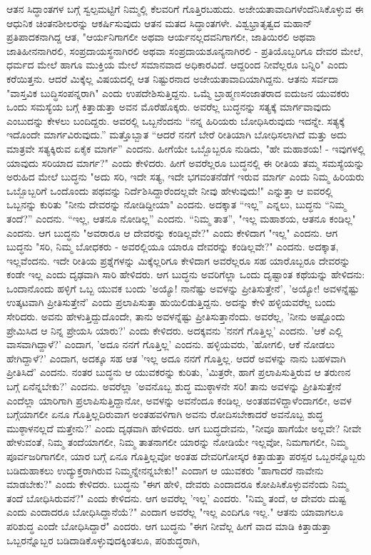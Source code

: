 ಆತನ ಸಿದ್ಧಾಂತಗಳ ಬಗ್ಗೆ ಸ್ವಲ್ಪಮಟ್ಟಿಗೆ ನಿಮ್ಮಲ್ಲಿ ಕೆಲವರಿಗೆ ಗೊತ್ತಿರಬಹುದು. ಅಜೇಯತಾವಾದಿಗಳೆಂದೆನಿಸಿಕೊಳ್ಳುವ ಈ ಆಧುನಿಕ ಚಿಂತನಶೀಲರನ್ನು ಆಕರ್ಷಿಸುವುದು ಆತನ ಮತದ ಸಿದ್ಧಾಂತಗಳೇ. ವಿಶ್ವಭ್ರಾತೃತ್ವದ ಮಹಾನ್ ಪ್ರತಿಪಾದಕನಾಗಿದ್ದ ಆತ, "ಆರ್ಯನಿಗಾಗಲೀ ಅಥವಾ ಆರ್ಯನಲ್ಲದವನಿಗಾಗಲೀ, ಜಾತಿಯಿರಲಿ ಅಥವಾ ಜಾತಿಹೀನನಾಗಿರಲಿ, ಸಂಪ್ರದಾಯಸ್ಥನಾಗಿರಲಿ ಅಥವಾ ಸಂಪ್ರದಾಯಶೂನ್ಯನಾಗಿರಲಿ - ಪ್ರತಿಯೊಬ್ಬರಿಗೂ ದೇವರ ಮೇಲೆ, ಧರ್ಮದ ಮೇಲೆ ಹಾಗೂ ಮುಕ್ತಿಯ ಮೇಲೆ ಸಮಾನವಾದ ಅಧಿಕಾರವಿದೆ. ಆದ್ದರಿಂದ ನೀವೆಲ್ಲರೂ ಬನ್ನಿರಿ" ಎಂದು ಕರೆಯಿತ್ತನು. ಆದರೆ ಮಿಕ್ಕೆಲ್ಲ ವಿಷಯದಲ್ಲಿ ಆತ ನಿಷ್ಟುರನಾದ ಅಜೇಯತಾವಾದಿಯಾಗಿದ್ದನು. ಆತನು ಸರ್ವದಾ "ವಾಸ್ತವಿಕ ಬುದ್ಧಿಸಂಪನ್ನರಾಗಿ" ಎಂದು ಉಪದೇಶಿಸುತ್ತಿದ್ದನು. ಒಮ್ಮೆ ಬ್ರಾಹ್ಮಣಸಂಜಾತರಾದ ಐದುಜನ ಯುವಕರು ಒಂದು ಸಮಸ್ಯೆಯ ಬಗ್ಗೆ ಕಿತ್ತಾಡುತ್ತಾ ಅವನ ಮೊರೆಹೊಕ್ಕರು. ಅವರೆಲ್ಲ ಬುದ್ಧನನ್ನು ಸತ್ಯಕ್ಕೆ ಮಾರ್ಗವಾವುದು ಎಂಬುದನ್ನು ಕೇಳಲು ಬಂದಿದ್ದರು. ಅವರಲ್ಲಿ ಒಬ್ಬನೆಂದನು “ನನ್ನ ಹಿರಿಯರು ಬೋಧಿಸಿರುವುದು ಇದನ್ನೇ. ಸತ್ಯಕ್ಕೆ ಇದೊಂದೇ ಮಾರ್ಗವಿರುವುದು.” ಮತ್ತೊಬ್ಬಾತ “ಆದರೆ ನನಗೆ ಬೇರೆ ರೀತಿಯಾಗಿ ಬೋಧಿಸಲಾಗಿದೆ ಮತ್ತು ಅದು ಮಾತ್ರವೇ ಸತ್ಯಕ್ಕಿರುವ ಏಕೈಕ ಮಾರ್ಗ” ಎಂದನು. ಹೀಗೆಯೇ ಒಬ್ಬೊಬ್ಬರೂ ನುಡಿದು, "ಹೇ ಮಹಾಶಯ! - ಇವುಗಳಲ್ಲಿ ಯಾವುದು ಸರಿಯಾದ ಮಾರ್ಗ?" ಎಂದು ಕೇಳಿದರು. ಹೀಗೆ ಅವರೆಲ್ಲರೂ ಬುದ್ಧನಲ್ಲಿ ಈ ರೀತಿಯ ತಮ್ಮ ಸಮಸ್ಯೆಯನ್ನು ಅರುಹಿದ ಮೇಲೆ ಬುದ್ಧನು "ಅದು ಸರಿ, ಇದೇ ಸತ್ಯ, ಇದೇ ಭಗವಂತನೆಡೆಗೆ ಇರುವ ಮಾರ್ಗ ಎಂದು ನಿಮ್ಮ ಹಿರಿಯರು ಒಬ್ಬೊಬ್ಬರಿಗೆ ಒಂದೊಂದು ಪಥವನ್ನು ನಿರ್ದೆಶಿಸಿದ್ದಾರೆಂದಲ್ಲವೇ ನೀವು ಹೇಳುವುದು!" ಎನ್ನುತ್ತಾ ಆ ಐವರಲ್ಲಿ ಒಬ್ಬನನ್ನು ಕುರಿತು "ನೀನು ದೇವರನ್ನು ನೋಡಿದ್ದೀಯಾ" ಎಂದನು. ಅದಕ್ಕಾತ “ಇಲ್ಲ” ಎನ್ನಲು, ಬುದ್ಧನು “ನಿಮ್ಮ ತಂದೆ?” ಎಂದನು. “ಇಲ್ಲ, ಆತನೂ ನೋಡಿಲ್ಲ” ಎಂದನು. “ನಿಮ್ಮ ತಾತ”, "ಇಲ್ಲ ಮಹಾಶಯ, ಆತನೂ ಕಂಡಿಲ್ಲ" ಎಂದನು. ಆಗ ಬುದ್ಧನು "ಅವರಾರೂ ಆ ದೇವರನ್ನು ಕಂಡಿಲ್ಲವೇ?" ಎಂದು ಕೇಳಿದಾಗ "ಇಲ್ಲ" ಎಂದನು. ಆಗ ಬುದ್ಧನು "ಸರಿ, ನಿಮ್ಮ ಬೋಧಕರು - ಅವರಲ್ಲಿಯೂ ಯಾರೂ ದೇವರನ್ನು ಕಂಡಿಲ್ಲವೇ?" ಎಂದನು. ಅದಕ್ಕಾತ, ಇಲ್ಲವೆಂದನು. ಇದೇ ರೀತಿಯ ಪ್ರಶ್ನೆಗಳನ್ನು ಮಿಕ್ಕೆಲ್ಲರಿಗೂ ಕೇಳಿದಾಗ ಅವರೆಲ್ಲರೂ ಸಹ ಯಾರೊಬ್ಬರೂ ದೇವರನ್ನು ಕಂಡೇ ಇಲ್ಲ ಎಂದು ದೃಢವಾಗಿ ಸಾರಿ ಹೇಳಿದರು. ಆಗ ಬುದ್ಧನು ಅವರಿಗೆಲ್ಲಾ ಒಂದು ದೃಷ್ಟಾಂತ ಕಥೆಯನ್ನು ಹೇಳಿದನು: ಒಂದಾನೊಂದು ಹಳ್ಳಿಗೆ ಒಬ್ಬ ಯುವಕ ಬಂದು 'ಅಯ್ಯೊ! ನಾನೆಷ್ಟು ಅವಳನ್ನು ಪ್ರೀತಿಸುತ್ತೇನೆ', 'ಅಯ್ಯೋ! ಅವಳನ್ನೆಷ್ಟು ಉತ್ಕಟವಾಗಿ ಪ್ರೀತಿಸುತ್ತೇನೆ' ಎಂದು ಪ್ರಲಾಪಿಸುತ್ತಾ ಹುಯಿಲಿಡುತ್ತಿದ್ದನು. ಅದನ್ನು ಕೇಳಿ ಹಳ್ಳಿಯವರೆಲ್ಲ ಬಂದು ಸೇರಿದರು. ಅವನು ಹೇಳುತ್ತಿದ್ದುದೊಂದೇ, ತಾನು ಅವಳನ್ನೆಷ್ಟು ಪ್ರೀತಿಸುತ್ತಾನೆಂದು. ಅವರೆಲ್ಲ, 'ನೀನು ಅಷ್ಟೊಂದು ಪ್ರೇಮಿಸಿದ ಆ ನಿನ್ನ ಪ್ರೇಯಸಿ ಯಾರು?' ಎಂದು ಕೇಳಿದರು. ಅದಕ್ಕವನು 'ನನಗೆ ಗೊತ್ತಿಲ್ಲ' ಎಂದನು. 'ಆಕೆ ಎಲ್ಲಿ ವಾಸವಾಗಿದ್ದಾಳೆ?' ಎಂದಾಗ, 'ಅದೂ ನನಗೆ ಗೊತ್ತಿಲ್ಲ' ಎಂದನು. ಹಳ್ಳಿಯವರು, 'ಹೋಗಲಿ, ಆಕೆ ನೋಡಲು ಹೇಗಿದ್ದಾಳೆ?' ಎಂದಾಗ, ಅದಕ್ಕೂ ಸಹ ಆತ 'ಇಲ್ಲ ಅದೂ ನನಗೆ ಗೊತ್ತಿಲ್ಲ. ಆದರೆ ಅವಳನ್ನು ನಾನು ಬಹಳವಾಗಿ ಪ್ರೀತಿಸಿದೆ' ಎಂದನು. ನಂತರ ಬುದ್ಧನು ಆ ಯುವಕರನ್ನು ಕುರಿತು, 'ಮಿತ್ರರೇ, ಹಾಗೆ ಪ್ರಲಾಪಿಸುತ್ತಿರುವ ಆ ತರುಣನ ಬಗ್ಗೆ ಏನೆನ್ನಬೇಕು?' ಎಂದನು. ಅವರೆಲ್ಲಾ 'ಅವನೊಬ್ಬ ಶುದ್ಧ ಮುಠ್ಠಾಳನೇ ಸರಿ! ತಾನು ಅವಳನ್ನು ಪ್ರೀತಿಸುತ್ತೇನೆ ಎಂದೆಲ್ಲಾ ಯಾರಿಗಾಗಿ ಪ್ರಲಾಪಿಸುತ್ತಿದ್ದಾನೋ, ಅವಳನ್ನು ಅವನೆಂದೂ ಕಂಡಿಲ್ಲ. ಅಂತಹವಳಿದ್ದಾಳೆಂದಾಗಲೀ, ಅವಳ ಬಗ್ಗೆಯಾಗಲೀ ಏನೂ ಗೊತ್ತಿಲ್ಲದಿರುವಾಗ ಅಂತಹವಳಿಗಾಗಿ ಅವನು ರೋದಿಸಬೇಕಾದರೆ ಅವನೊಬ್ಬ ಶುದ್ಧ ಮುಠ್ಠಾಳನಲ್ಲದೆ ಮತ್ತೇನು?' ಎಂದು ದೃಢವಾಗಿ ಹೇಳಿದರು. ಆಗ ಬುದ್ಧದೇವನು, "ನೀವೂ ಹಾಗೆಯೇ ಅಲ್ಲವೇ? ನೀವೇ ಹೇಳುವಂತೆ, ನಿಮ್ಮ ತಂದೆಯಾಗಲೀ, ನಿಮ್ಮ ತಾತನಾಗಲೀ ಯಾರನ್ನು ನೋಡಿಯೇ ಇಲ್ಲವೋ, ನಿಮಗಾಗಲೀ, ನಿಮ್ಮ ಪೂರ್ವಜರಿಗಾಗಲೀ, ಯಾರ ಬಗ್ಗೆ ಏನೂ ಗೊತ್ತಿಲ್ಲವೋ ಅಂತಹ ದೇವರಿಗೋಸ್ಕರ ಕಿತ್ತಾಡುತ್ತಾ ಪರಸ್ಪರ ಒಬ್ಬರನ್ನೊಬ್ಬರು ಬಡಿದುಹಾಕಲು ಉದ್ಯುಕ್ತರಾಗಿರುವ ನಿಮ್ಮನ್ನೇನನ್ನಬೇಕು!" ಎಂದಾಗ ಆ ಯುವಕರು "ಹಾಗಾದರೆ ನಾವೇನು ಮಾಡಬೇಕು?" ಎಂದು ಕೇಳಿದರು. ಬುದ್ಧನು "ಈಗ ಹೇಳಿ, ದೇವರು ಎಂದಾದರೂ ಕೋಪಿಸಿಕೊಳ್ಳುವನೆಂದು ನಿಮ್ಮ ತಂದೆ ಬೋಧಿಸಿರುವನೆ?" ಎಂದು ಕೇಳಿದನು. ಆಗ ಅವರೆಲ್ಲ 'ಇಲ್ಲ' ಎಂದರು. "ನಿಮ್ಮ ತಂದೆ, ಆ ದೇವರು ದುಷ್ಟ ಎಂದು ಎಂದಾದರೂ ಬೋಧಿಸಿದ್ದಾನೆಯೆ?" ಎಂದಾಗ ಅವರೆಲ್ಲ "ಇಲ್ಲ ಎಂದಿಗೂ ಇಲ್ಲ." ಆತನು ಯಾವಾಗಲೂ ಪರಿಶುದ್ಧ ಎಂದೇ ಬೋಧಿಸಿದ್ದಾರೆ" ಎಂದರು. ಆಗ ಬುದ್ಧನು "ಈಗ ನೀವೆಲ್ಲ ಹೀಗೆ ವಾದ ಮಾಡಿ ಕಿತ್ತಾಡುತ್ತಾ ಒಬ್ಬರನ್ನೊಬ್ಬರ ಬಡಿದಾಡಿಕೊಳ್ಳುವುದಕ್ಕಿಂತಲೂ, ಪರಿಶುದ್ಧರಾಗಿ, 